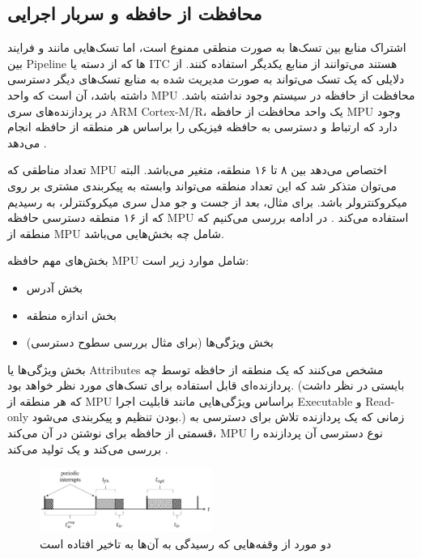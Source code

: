 \documentclass[10pt, a4paper]{article}
\begin{document}
\subsection{محافظت از حافظه و سربار اجرایی}

اشتراک منابع بین تسک‌ها به صورت منطقی ممنوع است، اما تسک‌هایی مانند  و فرایند بین Pipeline ها که از دسته  یا ITC
هستند می‌توانند از منابع یکدیگر استفاده کنند. از دلایلی که یک تسک می‌تواند به
صورت مدیریت شده به منابع تسک‌های دیگر دسترسی داشته باشد، آن است که واحد MPU
محافظت از حافظه در سیستم وجود نداشته باشد. در پردازنده‌های سری ARM Cortex-M/R،
یک واحد محافظت از حافظه MPU وجود دارد که ارتباط و دسترسی به حافظه فیزیکی را
براساس هر منطقه از حافظه انجام می‌دهد \cite{cortexm4arm}.

تعداد مناطقی که MPU اختصاص می‌دهد بین ۸ تا ۱۶ منطقه، متغیر می‌باشد. البته
می‌توان متذکر شد که این تعداد منطقه می‌تواند وابسته به پیکربندی مشتری بر روی
میکروکنترولر باشد. برای مثال، بعد از جست و جو مدل سری میکروکنترلر، به  رسیدیم که از ۱۶ منطقه دسترسی حافظه MPU استفاده می‌کند
\cite{armnxpimxrt1020}. در ادامه بررسی می‌کنیم که منطقه از MPU شامل چه بخش‌هایی
می‌باشد.

بخش‌های مهم حافظه MPU شامل موارد زیر است:

\begin{itemize}
    \item بخش آدرس
    \item بخش اندازه منطقه
    \item بخش ویژگی‌ها (برای مثال بررسی سطوح دسترسی)
\end{itemize}

بخش ویژگی‌ها یا Attributes مشخص می‌کنند که یک منطقه از حافظه توسط چه پردازنده‌ای
قابل استفاده برای تسک‌های مورد نظر خواهد بود. (بایستی در نظر داشت که هر منطقه از
MPU براساس ویژگی‌هایی مانند قابلیت اجرا Executable و Read-only بودن تنظیم و
پیکربندی می‌شود.) زمانی که یک پردازنده تلاش برای دسترسی به قسمتی از حافظه برای
نوشتن در آن می‌کند، MPU نوع دسترسی آن پردازنده را بررسی می‌کند و یک
 تولید می‌کند \cite{armcortexm7} \cite{cortexm4arm}.

\begin{figure}
    \centering
    \includegraphics[width=0.5\textwidth]{figs/interrupt_handling_delay.png}
    \caption{دو مورد از وقفه‌هایی که رسیدگی به آن‌ها به تاخیر افتاده است}
    \label{fig:interruptHandlingDelayed}
\end{figure}
\end{document}
